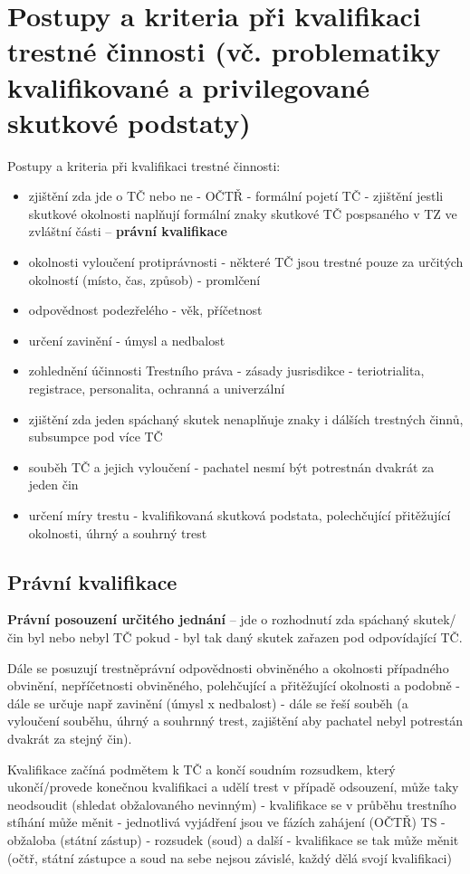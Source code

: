 \section{Postupy a kriteria při kvalifikaci trestné činnosti (vč. problematiky kvalifikované a privilegované skutkové podstaty)}
Postupy a kriteria při kvalifikaci trestné činnosti:
\begin{itemize}
    \item zjištění zda jde o TČ nebo ne - OČTŘ - formální pojetí TČ - zjištění jestli skutkové okolnosti
    naplňují formální znaky skutkové TČ pospsaného v TZ ve zvláštní části -- \textbf{právní kvalifikace}
    \item okolnosti vyloučení protiprávnosti - některé TČ jsou trestné pouze za určitých okolností
    (místo, čas, způsob) - promlčení
    \item odpovědnost podezřelého - věk, příčetnost
    \item určení zavinění - úmysl a nedbalost
    \item zohlednění účinnosti Trestního práva - zásady jusrisdikce - teriotrialita, registrace,
    personalita, ochranná a univerzální
    \item zjištění zda jeden spáchaný skutek nenaplňuje znaky i dálších trestných činnů, subsumpce
    pod více TČ
    \item souběh TČ a jejich vyloučení - pachatel nesmí být potrestnán dvakrát za jeden čin
    \item určení míry trestu - kvalifikovaná skutková podstata, polechčující přitěžující okolnosti, úhrný
    a souhrný trest
\end{itemize}

\subsection{Právní kvalifikace}
\textbf{Právní posouzení určitého jednání} -- jde o rozhodnutí zda spáchaný skutek/čin byl nebo nebyl TČ pokud - byl tak daný skutek zařazen pod odpovídající TČ. 

Dále se posuzují trestněprávní odpovědnosti obviněného a okolnosti případného obvinění, nepříčetnosti obviněného, polehčující a přitěžující okolnosti a podobně - dále se určuje např zavinění (úmysl x nedbalost) - dále se řeší
souběh (a vyloučení souběhu, úhrný a souhrnný trest, zajištění aby pachatel nebyl potrestán
dvakrát za stejný čin). 

Kvalifikace začíná podmětem k TČ a končí soudním rozsudkem, který ukončí/provede konečnou kvalifikaci a udělí trest v případě odsouzení, může taky neodsoudit (shledat obžalovaného nevinným) - kvalifikace se v průběhu trestního stíhání může měnit - jednotlivá vyjádření jsou ve fázích zahájení (OČTŘ) TS - obžaloba (státní zástup) - rozsudek (soud)
a další - kvalifikace se tak může měnit (očtř, státní zástupce a soud na sebe nejsou závislé, každý
dělá svojí kvalifikaci)

